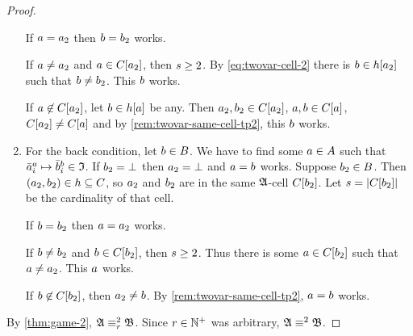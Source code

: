 \begin{proof}
\begin{enumerate}
  If $a = a_{2}$ then $b = b_{2}$ works.
 
  If $a \neq a_{2}$ and $a \in C[a_{2}]$, then $s \geq 2$.
  By \cref{eq:twovar-cell-2} there is $b \in h[a_{2}]$ such that
  $b \neq b_{2}$. This $b$ works.

  If $a \not\in C[a_{2}]$, let $b \in h[a]$ be any.
  Then $a_{2}, b_{2} \in C[a_{2}]$, $a, b \in C[a]$,
  $C[a_{2}] \neq C[a]$ and by \cref{rem:twovar-same-cell-tp2},
  this $b$ works.
  \item For the back condition, let $b \in B$.
  We have to find some $a \in A$ such that
  $\bar{a}_{i}^{a} \mapsto \bar{b}_{i}^{b} \in \mathfrak{I}$.
  If $b_{2} = \bot$ then $a_{2} = \bot$ and $a = b$ works.
  Suppose $b_{2} \in B$. Then $(a_{2},b_{2}) \in h \subseteq C$,
  so $a_{2}$ and $b_{2}$ are in the same $\mathfrak{A}$-cell $C[b_{2}]$.
  Let $s = \left|C[b_{2}]\right|$ be the cardinality of that cell.
  
  If $b = b_{2}$ then $a = a_{2}$ works.
  
  If $b \neq b_{2}$ and $b \in C[b_{2}]$, then $s \geq 2$.
  Thus there is some $a \in C[b_{2}]$ such that $a \neq a_{2}$.
  This $a$ works.
  
  If $b \not\in C[b_{2}]$, then $a_{2} \neq b$.
  By \cref{rem:twovar-same-cell-tp2}, $a = b$ works.
\end{enumerate}
By \cref{thm:game-2}, $\mathfrak{A} \equiv_{r}^{2} \mathfrak{B}$. Since $r \in \mathbb{N}^{+}$
was arbitrary, $\mathfrak{A} \equiv^{2} \mathfrak{B}$.
\end{proof}